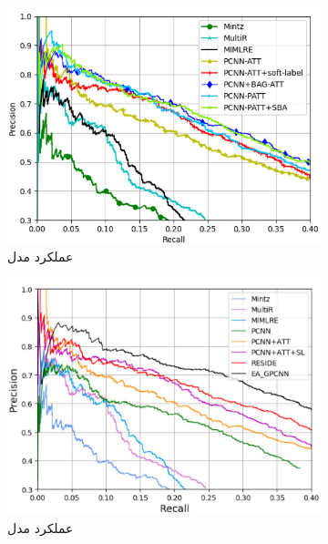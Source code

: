 \begin{figure}[h]
    \begin{subfigure}{0.3\linewidth}
        \includegraphics[width=\linewidth]{images/pos_attension/performance.png}
        \caption{عملکرد مدل }
    \end{subfigure}
    \begin{subfigure}{0.3\linewidth}
        \includegraphics[width=\linewidth]{images/gated/performance.png}
        \caption{عملکرد مدل }
    \end{subfigure}
    \begin{subfigure}{0.3\linewidth}

\end{subfigure}
\end{figure}
